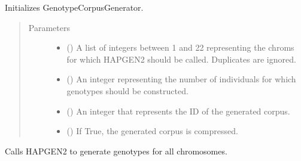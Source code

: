 \documentclass[a4paper,10pt,english]{sphinxhowto}
\begin{document}
\begin{fulllineitems}
\begin{fulllineitems}
\label{\detokenize{utils:utils.genotype_corpus_generator.GenotypeCorpusGenerator.__init__}}
Initializes GenotypeCorpusGenerator.
\begin{quote}\begin{description}
\item[{Parameters}] \leavevmode\begin{itemize}
\item {} 
 () \textendash{} A list of integers between 1 and 22 representing the chroms for which
HAPGEN2 should be called. Duplicates are ignored.

\item {} 
 () \textendash{} An integer representing the number of individuals for which genotypes should
be constructed.

\item {} 
 () \textendash{} An integer that represents the ID of the generated corpus.

\item {} 
 () \textendash{} If True, the generated corpus is compressed.

\end{itemize}

\end{description}\end{quote}

\end{fulllineitems}


\begin{fulllineitems}
\label{\detokenize{utils:utils.genotype_corpus_generator.GenotypeCorpusGenerator.call_hapgen2}}
Calls HAPGEN2 to generate genotypes for all chromosomes.


\end{fulllineitems}
\end{fulllineitems}
\end{document}

